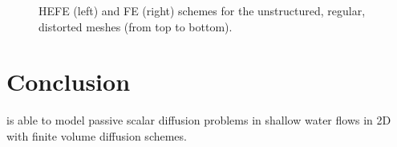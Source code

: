 \begin{figure}[h!]
\begin{minipage}[t]{0.5\textwidth}
 \centering
\end{minipage}%
\begin{minipage}[t]{0.5\textwidth}
 \centering
\end{minipage}
\begin{minipage}[t]{0.5\textwidth}
 \centering
\end{minipage}%
\begin{minipage}[t]{0.5\textwidth}
 \centering
\end{minipage}
\begin{minipage}[t]{0.5\textwidth}
 \centering
\end{minipage}%
\begin{minipage}[t]{0.5\textwidth}
 \centering
\end{minipage}
  \caption{HEFE (left) and FE (right) schemes for the unstructured, regular, distorted meshes (from top to bottom).}
  \label{fig:cone_diffusion:T1_comparisons_tf_fe}
\end{figure}


\section{Conclusion}
 is able to model passive scalar diffusion problems in shallow water
flows in 2D with finite volume diffusion schemes.
